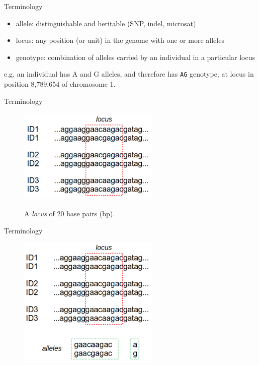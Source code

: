 \begin{frame}{Terminology}

        \bigskip

        \begin{itemize}
		\item allele: distinguishable and heritable (SNP, indel, microsat)
		\item locus: any position (or unit) in the genome with one or more alleles
		\item genotype: combination of alleles carried by an individual in a 
		particular locus
        \end{itemize}

	e.g. an individual has A and G alleles, and therefore has \texttt{AG} genotype, 
	at locus in position 8,789,654 of chromosome 1.


\end{frame}


\begin{frame}{Terminology}

 	\begin{figure}
        	\includegraphics[width=0.6\textwidth]{Pics/locus} \
		\caption{A \textit{locus} of 20 base pairs (bp).}
        \end{figure}

\end{frame}


\begin{frame}{Terminology}

        \begin{figure}
                \includegraphics[width=0.6\textwidth]{Pics/alleles}
        \end{figure}

\end{frame}


